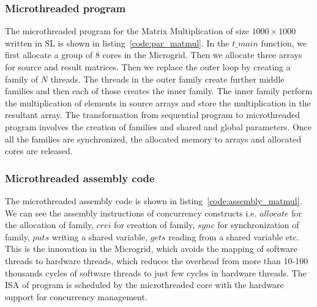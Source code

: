 \documentclass{article}
\begin{document}
\begin{figure}
\begin{minipage}{\textwidth}
\scriptsize
\lstset{float, language=C, caption=Sequential execution of Matrix Multiplication.,
label=code:seq_matmul} 
\end{minipage}
\end{figure}

\subsubsection*{Microthreaded program}

The microthreaded program for the Matrix Multiplication of size $1000 \times
1000$ written in SL is shown in listing~\ref{code:par_matmul}. In the $t\_main$
function, we first allocate a group of 8 cores in the Microgrid. Then we
allocate three arrays for source and result matrices. Then we replace the outer
loop by creating a family of $N$ threads. The threads in the outer family
create further middle families and then each of those creates the inner family.
The inner family perform the multiplication of elements in source arrays and
store the multiplication in the resultant array. The transformation from
sequential program to microthreaded program involves the creation of families
and shared and global parameters. Once all the families are synchronized, the
allocated memory to arrays and allocated cores are released.

\begin{figure}
\begin{minipage}{\textwidth}
\scriptsize
\lstset{float, language=C, caption=The microthreaded version of Matrix Multiplication.,
label=code:par_matmul} 
\end{minipage}
\end{figure}

\subsubsection*{Microthreaded assembly code}

The microthreaded assembly code is shown in listing~\ref{code:assembly_matmul}. We
can see the assembly instructions of concurrency constructs i.e. $allocate$ for
the allocation of family, $crei$ for creation of family, $sync$ for
synchronization of family, $puts$ writing a shared variable, $gets$ reading
from a shared variable etc. This is the innovation in the Microgrid, which
avoids the mapping of software threads to hardware threads, which reduces the
overhead from more than 10-100 thousands cycles of software threads to just few
cycles in hardware threads. The ISA of
program is scheduled by the microthreaded core with the hardware support for
concurrency management.
\end{document}
